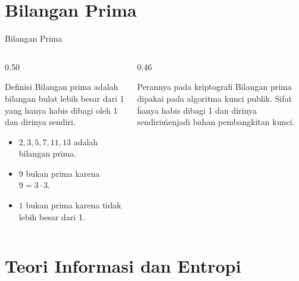 \documentclass[aspectratio=169,11pt]{beamer}
\begin{document}
\section{Bilangan Prima}

\begin{frame}{Bilangan Prima}
    \begin{columns}[T,onlytextwidth]
        \begin{column}{0.50\textwidth}
            \begin{block}{Definisi}
                Bilangan prima adalah bilangan bulat lebih besar dari 1 yang
                hanya habis dibagi oleh 1 dan dirinya sendiri.
            \end{block}
            \begin{itemize}
                \item $2, 3, 5, 7, 11, 13$ adalah bilangan prima.
                \item $9$ bukan prima karena $9 = 3 \cdot 3$.
                \item $1$ bukan prima karena tidak lebih besar dari 1.
            \end{itemize}
        \end{column}
        \begin{column}{0.46\textwidth}
            \begin{alertblock}{Perannya pada kriptografi}
                Bilangan prima dipakai pada algoritma kunci publik. Sifat
                \"hanya habis dibagi 1 dan dirinya sendiri\" menjadi bahan
                pembangkitan kunci.
            \end{alertblock}
        \end{column}
    \end{columns}
\end{frame}

\section{Teori Informasi dan Entropi}
\end{document}
